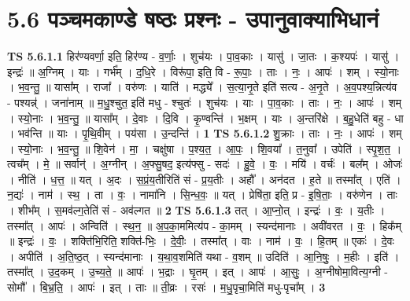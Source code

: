 \documentclass[17pt]{extarticle}
\begin{document}
\section*{ 5.6      पञ्चमकाण्डे षष्ठः प्रश्नः - उपानुवाक्याभिधानं }
                                \textbf{ TS 5.6.1.1} \newline
                  हिर॑ण्यवर्णा॒ इति॒ हिर॑ण्य - व॒र्णाः॒ । शुच॑यः । पा॒व॒काः । यासु॑ । जा॒तः । क॒श्यपः॑ । यासु॑ । इन्द्रः॑ ॥ अ॒ग्निम् । याः । गर्भ᳚म् । द॒धि॒रे । विरू॑पा॒ इति॒ वि - रू॒पाः॒ । ताः । नः॒ । आपः॑ । शम् । स्यो॒नाः । भ॒व॒न्तु॒ ॥ यासा᳚म् । राजा᳚ । वरु॑णः । याति॑ । मद्ध्ये᳚ । स॒त्या॒नृ॒ते इति॑ सत्य - अ॒नृ॒ते । अ॒व॒पश्य॒न्नित्य॑व - पश्यन्न्॑ । जना॑नाम् ॥ म॒धु॒श्चुत॒ इति॑ मधु - श्चुतः॑ । शुच॑यः । याः । पा॒व॒काः । ताः । नः॒ । आपः॑ । शम् । स्यो॒नाः । भ॒व॒न्तु॒ ॥ यासा᳚म् । दे॒वाः । दि॒वि । कृ॒ण्वन्ति॑ । भ॒क्षम् । याः । अ॒न्तरि॑क्षे । ब॒हु॒धेति॑ बहु - धा । भव॑न्ति ॥ याः । पृ॒थि॒वीम् । पय॑सा । उ॒न्दन्ति॑ । \textbf{  1} \newline
                  \newline
                                \textbf{ TS 5.6.1.2} \newline
                  शु॒क्राः । ताः । नः॒ । आपः॑ । शम् । स्यो॒नाः । भ॒व॒न्तु॒ ॥ शि॒वेन॑ । मा॒ । चक्षु॑षा । प॒श्य॒त॒ । आ॒पः॒ । शि॒वया᳚ । त॒नुवा᳚ । उपेति॑ । स्पृ॒श॒त॒ । त्वच᳚म् । मे॒ ॥ सर्वान्॑ । अ॒ग्नीन् । अ॒फ्सु॒षद॒ इत्य॑फ्सु - सदः॑ । हु॒वे॒ । वः॒ । मयि॑ । वर्चः॑ । बल᳚म् । ओजः॑ । नीति॑ । ध॒त्त॒ ॥ यत् । अ॒दः । स॒प्रं॒य॒तीरिति॑ सं - प्र॒य॒तीः । अहौ᳚ । अन॑दत । ह॒ते ॥ तस्मा᳚त् । एति॑ । न॒द्यः॑ । नाम॑ । स्थ॒ । ता । वः॒ । नामा॑नि । सि॒न्ध॒वः॒ ॥ यत् । प्रेषि॑ता॒ इति॒ प्र - इ॒षि॒ताः॒ । वरु॑णेन । ताः । शीभ᳚म् । स॒मव॑ल्ग॒तेति॑ सं - अव॑ल्गत ॥ \textbf{  2} \newline
                  \newline
                                \textbf{ TS 5.6.1.3} \newline
                  तत् । आ॒प्नो॒त् । इन्द्रः॑ । वः॒ । य॒तीः । तस्मा᳚त् । आपः॑ । अन्विति॑ । स्थ॒न॒ ॥ अ॒प॒का॒ममित्य॑प - का॒मम् । स्यन्द॑मानाः । अवी॑वरत । वः॒ । हिक᳚म् ॥ इन्द्रः॑ । वः॒ । शक्ति॑भि॒रिति॒ शक्ति॑-भिः॒ । दे॒वीः॒ । तस्मा᳚त् । वाः । नाम॑ । वः॒ । हि॒तम् ॥ एकः॑ । दे॒वः । अपीति॑ । अ॒ति॒ष्ठ॒त् । स्यन्द॑मानाः । य॒था॒व॒शमिति॑ यथा - व॒शम् ॥ उदिति॑ । आ॒नि॒षुः॒ । म॒हीः । इति॑ । तस्मा᳚त् । उ॒द॒कम् । उ॒च्य॒ते॒ ॥ आपः॑ । भ॒द्राः । घृ॒तम् । इत् । आपः॑ । आ॒सुः॒ । अ॒ग्नीषोमा॒वित्य॒ग्नी - सोमौ᳚ । बि॒भ्र॒ति॒ । आपः॑ । इत् । ताः ॥ ती॒व्रः । रसः॑ । म॒धु॒पृचा॒मिति॑ मधु-पृचा᳚म् । \textbf{  3} \newline
                  \newline
\end{document}
